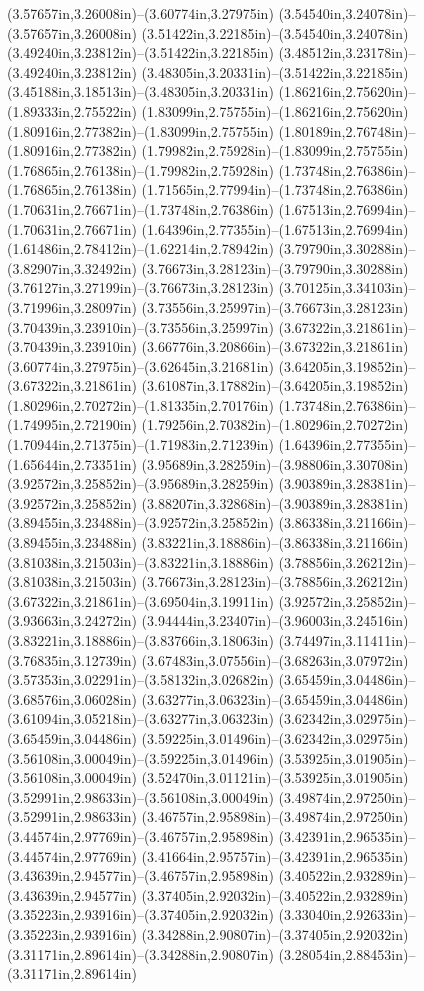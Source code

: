 (3.57657in,3.26008in)--(3.60774in,3.27975in) (3.54540in,3.24078in)--(3.57657in,3.26008in) (3.51422in,3.22185in)--(3.54540in,3.24078in) (3.49240in,3.23812in)--(3.51422in,3.22185in) (3.48512in,3.23178in)--(3.49240in,3.23812in) (3.48305in,3.20331in)--(3.51422in,3.22185in) (3.45188in,3.18513in)--(3.48305in,3.20331in) (1.86216in,2.75620in)--(1.89333in,2.75522in) (1.83099in,2.75755in)--(1.86216in,2.75620in) (1.80916in,2.77382in)--(1.83099in,2.75755in) (1.80189in,2.76748in)--(1.80916in,2.77382in) (1.79982in,2.75928in)--(1.83099in,2.75755in) (1.76865in,2.76138in)--(1.79982in,2.75928in) (1.73748in,2.76386in)--(1.76865in,2.76138in) (1.71565in,2.77994in)--(1.73748in,2.76386in) (1.70631in,2.76671in)--(1.73748in,2.76386in) (1.67513in,2.76994in)--(1.70631in,2.76671in) (1.64396in,2.77355in)--(1.67513in,2.76994in) (1.61486in,2.78412in)--(1.62214in,2.78942in) (3.79790in,3.30288in)--(3.82907in,3.32492in) (3.76673in,3.28123in)--(3.79790in,3.30288in) (3.76127in,3.27199in)--(3.76673in,3.28123in) (3.70125in,3.34103in)--(3.71996in,3.28097in) (3.73556in,3.25997in)--(3.76673in,3.28123in) (3.70439in,3.23910in)--(3.73556in,3.25997in) (3.67322in,3.21861in)--(3.70439in,3.23910in) (3.66776in,3.20866in)--(3.67322in,3.21861in) (3.60774in,3.27975in)--(3.62645in,3.21681in) (3.64205in,3.19852in)--(3.67322in,3.21861in) (3.61087in,3.17882in)--(3.64205in,3.19852in) (1.80296in,2.70272in)--(1.81335in,2.70176in) (1.73748in,2.76386in)--(1.74995in,2.72190in) (1.79256in,2.70382in)--(1.80296in,2.70272in) (1.70944in,2.71375in)--(1.71983in,2.71239in) (1.64396in,2.77355in)--(1.65644in,2.73351in) (3.95689in,3.28259in)--(3.98806in,3.30708in) (3.92572in,3.25852in)--(3.95689in,3.28259in) (3.90389in,3.28381in)--(3.92572in,3.25852in) (3.88207in,3.32868in)--(3.90389in,3.28381in) (3.89455in,3.23488in)--(3.92572in,3.25852in) (3.86338in,3.21166in)--(3.89455in,3.23488in) (3.83221in,3.18886in)--(3.86338in,3.21166in) (3.81038in,3.21503in)--(3.83221in,3.18886in) (3.78856in,3.26212in)--(3.81038in,3.21503in) (3.76673in,3.28123in)--(3.78856in,3.26212in) (3.67322in,3.21861in)--(3.69504in,3.19911in) (3.92572in,3.25852in)--(3.93663in,3.24272in) (3.94444in,3.23407in)--(3.96003in,3.24516in) (3.83221in,3.18886in)--(3.83766in,3.18063in) (3.74497in,3.11411in)--(3.76835in,3.12739in) (3.67483in,3.07556in)--(3.68263in,3.07972in) (3.57353in,3.02291in)--(3.58132in,3.02682in) (3.65459in,3.04486in)--(3.68576in,3.06028in) (3.63277in,3.06323in)--(3.65459in,3.04486in) (3.61094in,3.05218in)--(3.63277in,3.06323in) (3.62342in,3.02975in)--(3.65459in,3.04486in) (3.59225in,3.01496in)--(3.62342in,3.02975in) (3.56108in,3.00049in)--(3.59225in,3.01496in) (3.53925in,3.01905in)--(3.56108in,3.00049in) (3.52470in,3.01121in)--(3.53925in,3.01905in) (3.52991in,2.98633in)--(3.56108in,3.00049in) (3.49874in,2.97250in)--(3.52991in,2.98633in) (3.46757in,2.95898in)--(3.49874in,2.97250in) (3.44574in,2.97769in)--(3.46757in,2.95898in) (3.42391in,2.96535in)--(3.44574in,2.97769in) (3.41664in,2.95757in)--(3.42391in,2.96535in) (3.43639in,2.94577in)--(3.46757in,2.95898in) (3.40522in,2.93289in)--(3.43639in,2.94577in) (3.37405in,2.92032in)--(3.40522in,2.93289in) (3.35223in,2.93916in)--(3.37405in,2.92032in) (3.33040in,2.92633in)--(3.35223in,2.93916in) (3.34288in,2.90807in)--(3.37405in,2.92032in) (3.31171in,2.89614in)--(3.34288in,2.90807in) (3.28054in,2.88453in)--(3.31171in,2.89614in) 